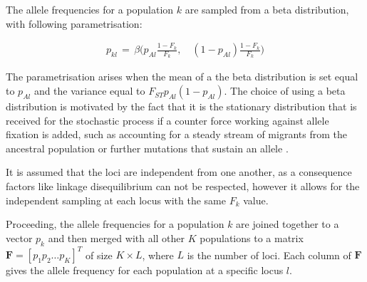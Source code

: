 \documentclass[a4paper, 11pt]{article}
\begin{document}
The allele frequencies for a population $k$ are sampled from a beta distribution, with following parametrisation:

\begin{align*}
p_{kl}\, =\, \beta\bigg(p_{Al} \frac{1 - F_k}{F_k}, \quad (1-p_{Al}) \frac{1 - F_k}{F_k} \bigg)
\end{align*}

The parametrisation arises when the mean of a the beta distribution is set equal to $p_{Al}$ and the variance equal to $F_{ST}p_{Al}(1-p_{Al})$.
The choice of using a beta distribution is motivated by the fact that it is the stationary distribution that is received for the stochastic process if a counter force working against allele fixation is added, such as accounting for a steady stream of migrants from the ancestral population or further mutations that sustain an allele \parencite{balding2003likelihood}.
 
It is assumed that the loci are independent from one another, as a consequence factors like linkage disequilibrium can not be respected, however it allows for the independent sampling at each locus with the same $F_k$ value.

Proceeding, the allele frequencies for a population $k$ are joined together to a vector $p_k$ and then merged with all other $K$ populations to a matrix $\mathbf{F} = [p_1 p_2 \ldots p_K]^T$ of size $K \times L$, where $L$ is the number of loci. Each column of $\mathbf{F}$ gives the allele frequency for each population at a specific locus $l$.\\

\end{document}
